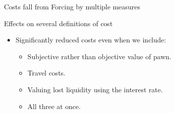 \documentclass[8pt]{beamer}
\begin{document}

   


\begin{frame}{Costs fall from Forcing by multiple measures}
\label{several_def_cost}
\begin{table}[H]
\caption{Effects on several definitions of cost}
\label{table_robustness_fc}
\begin{center}
\resizebox{0.95\textwidth}{!}{
\small{}
}
\end{center}
 \scriptsize 
 
\end{table}
 \begin{itemize}
     \item \vfill Significantly reduced costs even when we include:
     \begin{itemize}
         \item Subjective rather than objective value of pawn.
         \item Travel costs.
         \item Valuing lost liquidity using the interest rate.
         \item All three at once.
     \end{itemize}
\end{itemize}
\end{frame}
\end{document}
